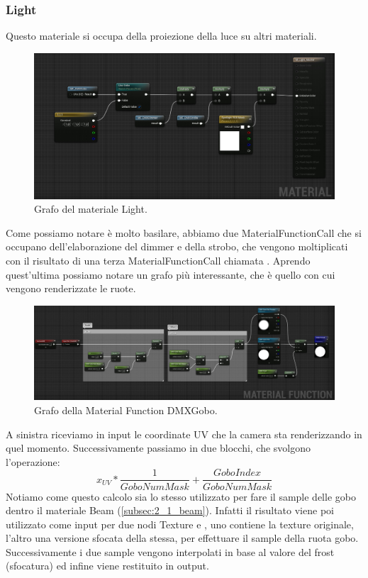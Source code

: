 \documentclass[main.tex]{subfiles}
\begin{document}
\clearpage
\subsubsection{Light}\label{subsec:2_1_light}
Questo materiale si occupa della proiezione della luce su altri materiali.
\begin{figure}[H]
    \centering
    \includegraphics[width=1\linewidth]{img/renderingPipeline/LightMaterialFull.jpg}
    \caption{Grafo del materiale Light.}
    \label{fig:2_lightGraphFull}
\end{figure}
\noindent Come possiamo notare è molto basilare, abbiamo due MaterialFunctionCall che si occupano dell'elaborazione del dimmer e della strobo, che vengono moltiplicati con il risultato di una terza MaterialFunctionCall chiamata . Aprendo quest'ultima possiamo notare un grafo più interessante, che è quello con cui vengono renderizzate le ruote.
\begin{figure}[H]
    \centering
    \includegraphics[width=1\linewidth]{img/renderingPipeline/DMXGoboMFFull.jpg}
    \caption{Grafo della Material Function DMXGobo.}
    \label{fig:2_dmxGoboGraphFull}
\end{figure}
\noindent A sinistra riceviamo in input le coordinate UV che la camera sta renderizzando in quel momento. Successivamente passiamo in due blocchi, che svolgono l'operazione:
\[x_{UV} * \frac{1}{GoboNumMask} + \frac{GoboIndex}{GoboNumMask}\]
Notiamo come questo calcolo sia lo stesso utilizzato per fare il sample delle gobo dentro il materiale Beam (\ref{subsec:2_1_beam}). Infatti il risultato viene poi utilizzato come input per due nodi Texture  e , uno contiene la texture originale, l'altro una versione sfocata della stessa, per effettuare il sample della ruota gobo. Successivamente i due sample vengono interpolati in base al valore del frost (sfocatura) ed infine viene restituito in output.
\end{document}
